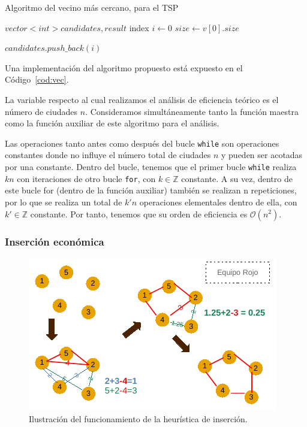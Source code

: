 \begin{algorithm}
    \caption{Algoritmo del vecino más cercano, para el TSP}\label{alg:vec_cercano}
    $vector<int> candidates,result$\;
    index\;
    $i \gets 0$\;
    $size \gets v[0].size$\;

    $candidates.push\_back(i)$\;

\end{algorithm}

Una implementación del algoritmo propuesto está expuesto en el Código~\ref{cod:vec}. 




La variable respecto al cual realizamos el análisis de eficiencia teórico es el número
de ciudades $n$. Consideramos simultáneamente tanto la función maestra como la función
auxiliar de este algoritmo para el análisis. 

Las operaciones tanto antes como después del bucle \texttt{while} son operaciones constantes
donde no influye el número total de ciudades $n$ y pueden ser acotadas por una
constante. Dentro del bucle, tenemos que
el primer bucle  \texttt{while} realiza $kn$ con iteraciones de otro bucle \texttt{for}, con 
$k \in \mathbb Z$ constante. A su vez, dentro de este bucle for (dentro de la función auxiliar) 
también se realizan n repeticiones,
por lo que se realiza un total de $k'n$ operaciones elementales dentro de ella, 
con $k' \in \mathbb Z$ constante. Por tanto, tenemos que su orden de 
eficiencia es $\boxed{\mathcal O(n^2)}$. 

\subsubsection{Inserción económica}

\begin{figure}[H] 
  \centering
  \includegraphics[scale=1.5]{img/DibInsercion.pdf}
  \caption{Ilustración del funcionamiento de la heurística de inserción.}
  \label{fig:inser}
\end{figure}

